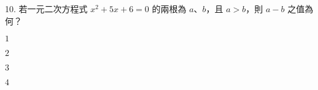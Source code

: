 \documentclass[12pt]{article}
\begin{document}
\begin{problem}[widest=10]
  \item[10.] 若一元二次方程式 $x^2 + 5x + 6 = 0$ 的兩根為 $a$、$b$，且 $a > b$，則 $a - b$ 之值為何？
  \begin{choices}
    \item $1$
    \item $2$
    \item $3$
    \item $4$
  \end{choices}
\end{problem}
\end{document}
